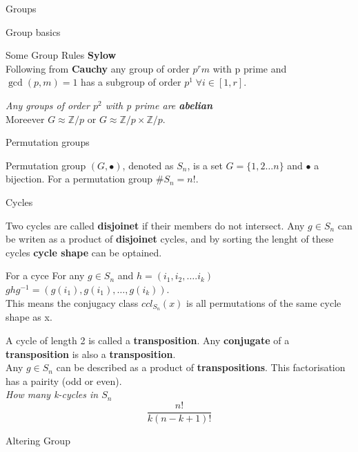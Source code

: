 \documentclass[12pt, letterpaper]{article}
\begin{document}
\begin{section}{Groups}
\begin{subsection}{Group basics}
\begin{subsubsection}{Some Group Rules}
      \textbf{Sylow} \\
      Following from \textbf{Cauchy} any group of order \(p^{r}m\) with p prime
      and \(\gcd(p, m) = 1\) has a subgroup of order
      \(p^{1} \; \forall i \in [1, r]\).

      \emph{Any groups of order \(p^{2}\) with p prime are \textbf{abelian}} \\
      Moreever \(G \approx \mathbb{Z} / p\) or
      \(G \approx \mathbb{Z} / p \times \mathbb{Z} / p\).

    \end{subsubsection}

  \end{subsection}

  \begin{subsection}{Permutation groups}

    Permutation group \((G, \bullet)\), denoted as \(S_{n}\), is a set
    \(G = \{ 1, 2 \dots n \}\) and \(\bullet\) a bijection.
    For a permutation group \(\#S_{n} = n!\). \\

    \begin{subsubsection}{Cycles}

      Two cycles are called \textbf{disjoinet} if their members do not intersect.
      Any \(g \in S_{n}\) can be writen as a product of \textbf{disjoinet}
      cycles, and by sorting the lenght of these cycles \textbf{cycle shape} can
      be optained.

      For a cyce For any \(g \in S_{n}\) and
      \(h = (i_{1}, i_{2}, \dots . i_{k})\)
      \(ghg^{-1} = (g(i_{1}), g(i_{1}), \dots , g(i_{k}))\). \\
      This means the conjugacy class \(ccl_{S_{n}}(x)\) is all permutations of
      the same cycle shape as x.

      A cycle of length 2 is called a \textbf{transposition}. Any
      \textbf{conjugate} of a \textbf{transposition} is also a
      \textbf{transposition}. \\

      Any \(g \in S_{n}\) can be described as a product of
      \textbf{transpositions}.
      This factorisation has a pairity (odd or even). \\

      \emph{How many k-cycles in \(S_{n}\) \[\frac{n!}{k(n-k+1)!}\]}

    \end{subsubsection}

    \begin{subsubsection}{Altering Group}


\end{subsubsection}
\end{subsection}
\end{section}
\end{document}

